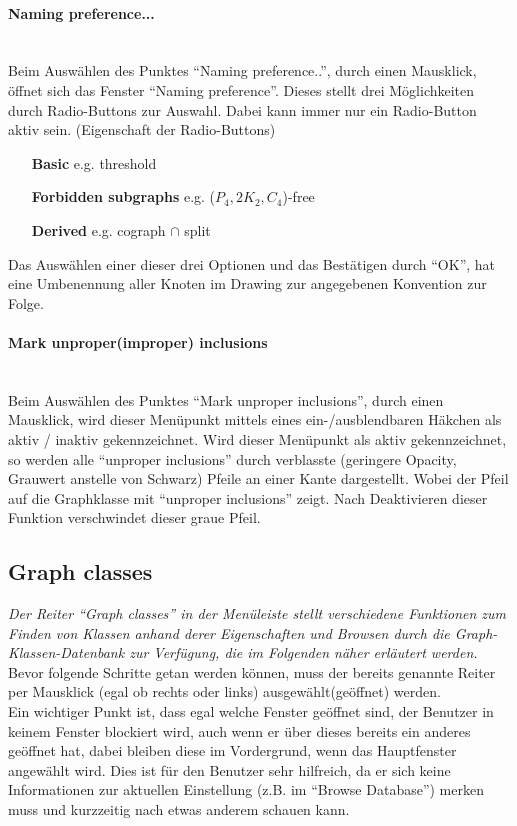 \documentclass[10pt,a4paper]{article}
\begin{document}
\paragraph{Naming preference...}\ \\
Beim Auswählen des Punktes "`Naming preference.."', durch einen Mausklick, öffnet sich das Fenster "`Naming preference"'. Dieses stellt drei Möglichkeiten durch Radio-Buttons zur Auswahl. Dabei kann immer nur ein Radio-Button aktiv sein. (Eigenschaft der Radio-Buttons) \\
\begin{itemize}
	\item[\bf{Basic}] e.g. threshold
	\item[\bf{Forbidden subgraphs}] e.g. ($P_4,2K_2,C_4$)-free
	\item[\bf{Derived}] e.g. cograph $\cap$ split\\
\end{itemize}
Das Auswählen einer dieser drei Optionen und das Bestätigen durch "`OK"', hat eine Umbenennung aller Knoten im Drawing zur angegebenen Konvention zur Folge.

\paragraph{Mark unproper(improper) inclusions}\ \\
Beim Auswählen des Punktes "`Mark unproper inclusions"', durch einen Mausklick, wird dieser Menüpunkt mittels eines ein-/ausblendbaren Häkchen als aktiv / inaktiv gekennzeichnet. Wird dieser Menüpunkt als aktiv gekennzeichnet, so werden alle "`unproper inclusions"' durch verblasste (geringere Opacity, Grauwert anstelle von Schwarz) Pfeile an einer Kante dargestellt. Wobei der Pfeil auf die Graphklasse mit "`unproper inclusions"' zeigt. Nach Deaktivieren dieser Funktion verschwindet dieser graue Pfeil.


\subsection{Graph classes}
\emph{Der Reiter "`Graph classes"' in der Menüleiste stellt verschiedene Funktionen zum Finden von Klassen anhand derer Eigenschaften und Browsen durch die Graph-Klassen-Datenbank zur Verfügung, die im Folgenden näher erläutert werden.}
Bevor folgende Schritte getan werden können, muss der bereits genannte Reiter per Mausklick (egal ob rechts oder links) ausgewählt(geöffnet) werden.\\
Ein wichtiger Punkt ist, dass egal welche Fenster geöffnet sind, der Benutzer in keinem Fenster blockiert wird, auch wenn er über dieses bereits ein anderes geöffnet hat, dabei bleiben diese im Vordergrund, wenn das Hauptfenster angewählt wird. Dies ist für den Benutzer sehr hilfreich, da er sich keine Informationen zur aktuellen Einstellung (z.B. im "`Browse Database"') merken muss und kurzzeitig nach etwas anderem schauen kann.
\end{document}
